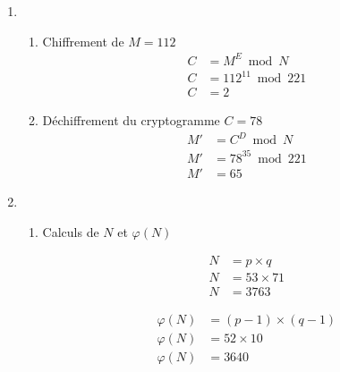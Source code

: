 \documentclass{homework}
\begin{document}
	
	\exercise
		\begin{enumerate}
			\item 
				\begin{enumerate}
    			\item Chiffrement de $M = 112$
    				\begin{equation*}
    					\begin{split}    				
    				C & = M^{E} \bmod N \\
    				C & = 112^{11} \bmod 221 \\
    				C & = 2
    					\end{split}
    				\end{equation*}
    			\item Déchiffrement du cryptogramme $C = 78$
    				\begin{equation*}
    					\begin{split}    				
    				M' & = C^{D} \bmod N \\
    				M' & = 78^{35} \bmod 221 \\
    				M' & = 65
    					\end{split}
    				\end{equation*}
   				\end{enumerate}
   			
   			\item 
				\begin{enumerate}
    			\item Calculs de $N$ et $\varphi(N)$
    			
    				\begin{minipage}{0.4\linewidth}
    					\begin{align*}    					   				    				
    						N & = p \times q \\
    						N & = 53 \times 71 \\
    						N & = 3763
    					\end{align*}
					\end{minipage}\hfill    					
    				\begin{minipage}{0.4\linewidth} 
    					\begin{align*}   				
    						\varphi(N) & = (p-1) \times (q-1)\\
    						\varphi(N) & = 52 \times 10 \\
    						\varphi(N) & = 3640
    					\end{align*}
    				\end{minipage}
    				
    				
    					

\end{enumerate}
\end{enumerate}
\end{document}
